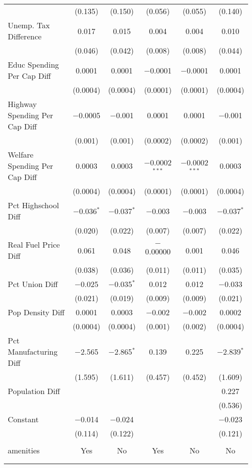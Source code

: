 \begin{table}[!htbp]
\begin{tabular}{@{\extracolsep{5pt}}lccccc}
  & (0.135) & (0.150) & (0.056) & (0.055) & (0.140) \\ 
  Unemp. Tax Difference & 0.017 & 0.015 & 0.004 & 0.004 & 0.010 \\ 
  & (0.046) & (0.042) & (0.008) & (0.008) & (0.044) \\ 
  Educ Spending Per Cap Diff & 0.0001 & 0.0001 & $-$0.0001 & $-$0.0001 & 0.0001 \\ 
  & (0.0004) & (0.0004) & (0.0001) & (0.0001) & (0.0004) \\ 
  Highway Spending Per Cap Diff & $-$0.0005 & $-$0.001 & 0.0001 & 0.0001 & $-$0.001 \\ 
  & (0.001) & (0.001) & (0.0002) & (0.0002) & (0.001) \\ 
  Welfare Spending Per Cap Diff & 0.0003 & 0.0003 & $-$0.0002$^{***}$ & $-$0.0002$^{***}$ & 0.0003 \\ 
  & (0.0004) & (0.0004) & (0.0001) & (0.0001) & (0.0004) \\ 
  Pct Highschool Diff & $-$0.036$^{*}$ & $-$0.037$^{*}$ & $-$0.003 & $-$0.003 & $-$0.037$^{*}$ \\ 
  & (0.020) & (0.022) & (0.007) & (0.007) & (0.022) \\ 
  Real Fuel Price Diff & 0.061 & 0.048 & $-$0.00000 & 0.001 & 0.046 \\ 
  & (0.038) & (0.036) & (0.011) & (0.011) & (0.035) \\ 
  Pct Union Diff & $-$0.025 & $-$0.035$^{*}$ & 0.012 & 0.012 & $-$0.033 \\ 
  & (0.021) & (0.019) & (0.009) & (0.009) & (0.021) \\ 
  Pop Density Diff & 0.0001 & 0.0003 & $-$0.002 & $-$0.002 & 0.0002 \\ 
  & (0.0004) & (0.0004) & (0.001) & (0.002) & (0.0004) \\ 
  Pct Manufacturing Diff & $-$2.565 & $-$2.865$^{*}$ & 0.139 & 0.225 & $-$2.839$^{*}$ \\ 
  & (1.595) & (1.611) & (0.457) & (0.452) & (1.609) \\ 
  Population Diff &  &  &  &  & 0.227 \\ 
  &  &  &  &  & (0.536) \\ 
  Constant & $-$0.014 & $-$0.024 &  &  & $-$0.023 \\ 
  & (0.114) & (0.122) &  &  & (0.121) \\ 
 \hline \\[-1.8ex] 
amenities & Yes & No & Yes & No & No \\ 
\hline \\[-1.8ex] 
\hline 
\hline \\[-1.8ex] 
\end{tabular} 
\end{table} 
